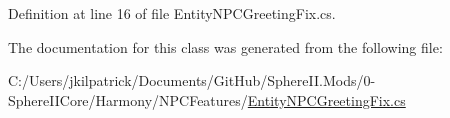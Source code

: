 Definition at line 16 of file Entity\+N\+P\+C\+Greeting\+Fix.\+cs.



The documentation for this class was generated from the following file\+:\begin{DoxyCompactItemize}
\item 
C\+:/\+Users/jkilpatrick/\+Documents/\+Git\+Hub/\+Sphere\+I\+I.\+Mods/0-\/\+Sphere\+I\+I\+Core/\+Harmony/\+N\+P\+C\+Features/\mbox{\hyperlink{_entity_n_p_c_greeting_fix_8cs}{Entity\+N\+P\+C\+Greeting\+Fix.\+cs}}\end{DoxyCompactItemize}
